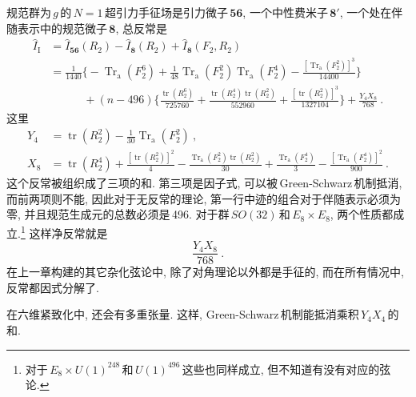 规范群为$\,g\,$的$\,N=1\,$超引力手征场是引力微子$\,\bm{56}$, 一个中性费米子$\,\bm{8}'$, 一个处在伴随表示中的规范微子$\,\bm{8}$, 总反常是
\begin{align}
    \hat{I}_{\text{I}} &=\hat{I}_{\bm{56}}(R_{\textit{2}}) -\hat{I}_{\bm{8}}(R_{\textit{2}}) +\hat{I}_{\bm{8}}(F_{\textit{2}},R_{\textit{2}}) \nonumber \\ 
    &=\frac{1}{1440} \biggl\{-\operatorname{Tr}_{\text{a}}(F_{\textit{2}}^{6})+\frac{1}{48} \operatorname{Tr}_{\text{a}}(F_{\textit{2}}^{2})
    \operatorname{Tr}_{\text{a}}(F_{\textit{2}}^{4}) -
    \frac{[\operatorname{Tr}_{\text{a}}(F_{\textit{2}}^{2})]^{3}}{14400} \biggr\} \nonumber \\
    &\qquad\quad  +(n-496)\biggl\{ \frac{\operatorname{tr}(R_{\textit{2}}^{6})}{725760}+ \frac{\operatorname{tr}(R_{\textit{2}}^{4})\operatorname{tr}(R_{\textit{2}}^{2})}{552960}+ \frac{[\operatorname{tr}(R_{\textit{2}}^{2})]^{3}}{1327104} \biggr\} +\frac{Y_{\textit{4}}X_{\textit{8}}}{768} \:. \label{12.2.27}
\end{align}
这里
\begin{subequations} \label{12.2.28}
    \begin{align}
        Y_{\textit{4}} &=\operatorname{tr}(R_{\textit{2}}^{2}) - \frac{1}{30}\operatorname{Tr}_{\text{a}}(F_{\textit{2}}^{2}) \:, \label{12.2.28a} \\
        X_{\textit{8}} &= \operatorname{tr}(R_{\textit{2}}^{4}) + 
        \frac{[\operatorname{tr}(R_{\textit{2}}^{2})]^{2}}{4} -
        \frac{\operatorname{Tr}_{\text{a}}(F_{\textit{2}}^{2})\operatorname{tr}(R_{\textit{2}}^{2})}{30} + \frac{\operatorname{Tr}_{\text{a}}(F_{\textit{2}}^{4})}{3} -\frac{[\operatorname{Tr}_{\text{a}}(F_{\textit{2}}^{4})]^{2}}{900} \:. \label{12.2.28b}
    \end{align}
\end{subequations} 
这个反常被组织成了三项的和. 第三项是因子式, 可以被\,Green-Schwarz\,机制抵消, 而前两项则不能, 因此对于无反常的理论, 第一行中迹的组合对于伴随表示必须为零, 并且规范生成元的总数必须是\,496. 对于群$\,SO(32)\,$和$\,E_{8}\times E_{8}$, 两个性质都成立.\footnote{对于$\,E_{8}\times U(1)^{248}\,$和$\,U(1)^{496}\,$这些也同样成立, 但不知道有没有对应的弦论.} 这样净反常就是
\begin{equation}
    \frac{Y_{\textit{4}}X_{\textit{8}}}{768} \:. \label{12.2.29}
\end{equation}
在上一章构建的其它杂化弦论中, 除了对角理论以外都是手征的, 而在所有情况中, 反常都因式分解了.

在六维紧致化中, 还会有多重张量. 这样, Green-Schwarz\,机制能抵消乘积$\,Y_{\textit{4}}X_{\textit{4}}\,$的和.




